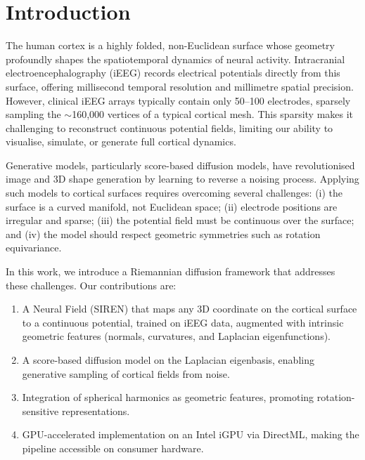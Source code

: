 \documentclass[twocolumn]{article}
\begin{document}
	\section{Introduction}
	The human cortex is a highly folded, non-Euclidean surface whose geometry profoundly shapes the spatiotemporal dynamics of neural activity. Intracranial electroencephalography (iEEG) records electrical potentials directly from this surface, offering millisecond temporal resolution and millimetre spatial precision. However, clinical iEEG arrays typically contain only 50--100 electrodes, sparsely sampling the $\sim$160,000 vertices of a typical cortical mesh. This sparsity makes it challenging to reconstruct continuous potential fields, limiting our ability to visualise, simulate, or generate full cortical dynamics.
	
	Generative models, particularly score-based diffusion models, have revolutionised image and 3D shape generation by learning to reverse a noising process. Applying such models to cortical surfaces requires overcoming several challenges: (i) the surface is a curved manifold, not Euclidean space; (ii) electrode positions are irregular and sparse; (iii) the potential field must be continuous over the surface; and (iv) the model should respect geometric symmetries such as rotation equivariance.
	
	In this work, we introduce a Riemannian diffusion framework that addresses these challenges. Our contributions are:
	\begin{enumerate}
		\item A Neural Field (SIREN) that maps any 3D coordinate on the cortical surface to a continuous potential, trained on iEEG data, augmented with intrinsic geometric features (normals, curvatures, and Laplacian eigenfunctions).
		\item A score-based diffusion model on the Laplacian eigenbasis, enabling generative sampling of cortical fields from noise.
		\item Integration of spherical harmonics as geometric features, promoting rotation-sensitive representations.
		\item GPU-accelerated implementation on an Intel iGPU via DirectML, making the pipeline accessible on consumer hardware.
	\end{enumerate}
	
\end{document}

